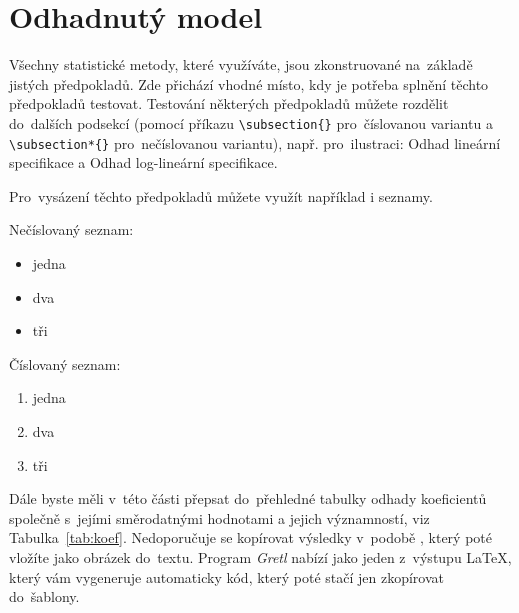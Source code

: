 \documentclass[12pt,a4paper,oneside,final]{article}
\theoremstyle{definition}
\theoremstyle{remark}
\numberwithin{equation}{section}
\begin{document}
\section{Odhadnutý model}

Všechny statistické metody, které využíváte, jsou zkonstruované na~základě jistých předpokladů. Zde přichází vhodné místo, kdy je potřeba splnění těchto předpokladů testovat. Testování některých předpokladů můžete rozdělit do~dalších podsekcí (pomocí příkazu \verb|\subsection{}| pro~číslovanou variantu a \verb|\subsection*{}| pro~nečíslovanou variantu), např. pro~ilustraci: Odhad lineární specifikace a Odhad log-lineární specifikace.

Pro~vysázení těchto předpokladů můžete využít například i seznamy.

\begin{minipage}[c]{.45\textwidth}
Nečíslovaný seznam:
\begin{itemize}
\item jedna
\item dva
\item tři
\end{itemize}
\end{minipage} %
\begin{minipage}[c]{.45\textwidth}
Číslovaný seznam:
\begin{enumerate}
\item jedna
\item dva
\item tři
\end{enumerate}
\end{minipage}

Dále byste měli v~této části přepsat do~přehledné tabulky odhady koeficientů společně s~jejími směrodatnými hodnotami a jejich významností, viz Tabulka~\ref{tab:koef}. Nedoporučuje se kopírovat výsledky v~podobě , který poté vložíte jako obrázek do~textu. Program \emph{Gretl} nabízí jako jeden z~výstupu \LaTeX{}, který vám vygeneruje automaticky kód, který poté stačí jen zkopírovat do~šablony.

\end{document}
